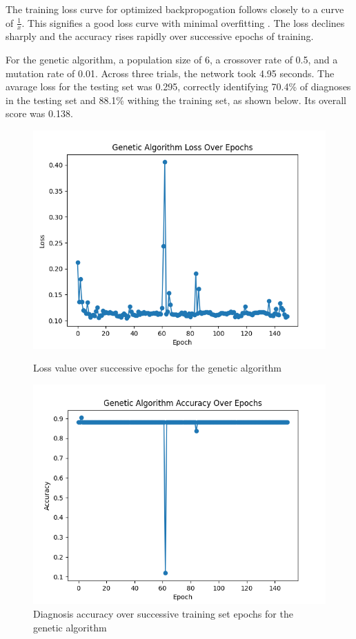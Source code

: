 \documentclass[12pt]{article}
\begin{document}
    The training loss curve for optimized backpropogation follows closely to a curve of \(\frac{1}{x}\).  This signifies a good loss curve with minimal
    overfitting \cite{goodLoss}.  The loss declines sharply and the accuracy rises rapidly over successive epochs of training.

    For the genetic algorithm, a population size of 6, a crossover rate of 0.5, and a mutation rate of 0.01.  Across three trials, the network
    took 4.95 seconds.  The avarage loss for the testing set was 0.295, correctly identifying 70.4\% of diagnoses in the testing set and 88.1\% withing the training set, as shown below.
    Its overall score was 0.138.
    
    \begin{figure}[h]
        \begin{minipage}{0.48\textwidth}
            \centering
            \includegraphics[width=.9\linewidth]{geneticlosses.png}
            \caption{Loss value over successive epochs for the genetic algorithm}
        \end{minipage}\hfill
        \begin{minipage}{0.48\textwidth}
            \centering
            \includegraphics[width=.9\linewidth]{geneticaccuracy.png}
            \caption{Diagnosis accuracy over successive training set epochs for the genetic algorithm}
        \end{minipage}
    \end{figure}
    
\end{document}
